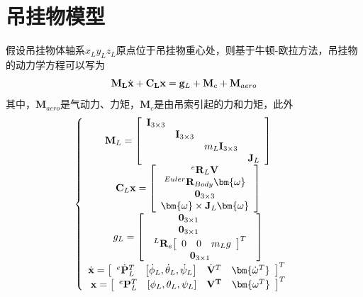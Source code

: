 \section{吊挂物模型}
假设吊挂物体轴系$x_Ly_Lz_L$原点位于吊挂物重心处，则基于牛顿-欧拉方法，吊挂物的动力学方程可以写为
\begin{equation}
  {{\bf{M}}_{\bf{L}}}{\dot{\bf{x}}} + {{\bf{C}}_{\bf{L}}}{\bf{x}} = {{\bf{g}}_L} + {{\bf{M}}_c} + {{\bf{M}}_{aero}}
  \label{equation:chap_4_1}
\end{equation}
其中，$\mathbf{M}_{aero}$是气动力、力矩，$\mathbf{M}_{c}$是由吊索引起的力和力矩，此外
\begin{equation}
  \left\{ {\begin{array}{*{20}{c}}
      {{{\bf{M}}_L} = \left[ {\begin{array}{*{20}{c}}
      {{{\bf{I}}_{3 \times 3}}}&{}&{}&{}\\
      {}&{{{\bf{I}}_{3 \times 3}}}&{}&{}\\
      {}&{}&{{m_L}{{\bf{I}}_{3 \times 3}}}&{}\\
      {}&{}&{}&{{{\bf{J}}_L}}
      \end{array}} \right]}\\
      {{{\bf{C}}_L}{\bf{x}} = \left[ {\begin{array}{*{20}{c}}
      {^e{{\bf{R}}_L}{\bf{V}}}\\
      {^{Euler}{{\bf{R}}_{Body}}{\bm{\omega }}}\\
      {{{\bf{0}}_{3 \times 3}}}\\
      {{\bm{\omega }} \times {{\bf{J}}_L}{\bm{\omega }}}
      \end{array}} \right]}\\
      {{g_L} = \left[ {\begin{array}{*{20}{c}}
      \begin{array}{l}
      \;\;\;\;\;\;\;\;\;{{\bf{0}}_{3 \times 1}}\\
      \;\;\;\;\;\;\;\;\;{{\bf{0}}_{3 \times 1}}\\
      ^L{{\bf{R}}_e}{\left[ {\begin{array}{*{20}{c}}
      0&0&{{m_L}g}
      \end{array}} \right]^T}
      \end{array}\\
      {{{\bf{0}}_{3 \times 1}}}
      \end{array}} \right]}\\
      {\dot{\bf{x}} = {{\left[ {\begin{array}{*{20}{c}}
      {^e{{\dot{\bf{P}}}_L}^T}&{\left[ {{{\dot \phi }_L},{{\dot \theta }_L},{{\dot \psi }_L}} \right]}&{\dot{\bf{V}}^T}&{{\bm{\dot \omega ^T}}}
      \end{array}} \right]}^T}\;}\\
      {{\bf{x}} = {{\left[ {\begin{array}{*{20}{c}}
      {^e{{\bf{P}}_L^T}}&{\left[ {{\phi _L},{\theta _L},{\psi _L}} \right]}&{\bf{V}^T}&{\bm{\omega ^T}}
      \end{array}} \right]}^T}}
      \end{array}} \right.
      \label{equation:chap_4_2_1}
\end{equation}
